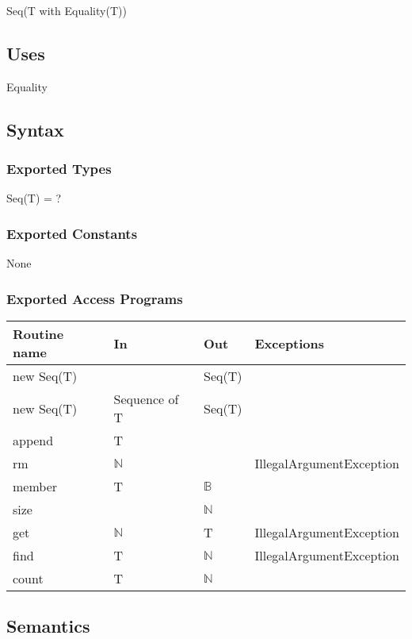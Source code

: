 \documentclass[12pt]{article}
\begin{document}
Seq(T with Equality(T))

\subsection* {Uses}

Equality

\subsection* {Syntax}

\subsubsection* {Exported Types}

Seq(T) = ?

\subsubsection* {Exported Constants}

None

\subsubsection* {Exported Access Programs}

\begin{tabular}{| l | l | l | p{5cm} |}
	\hline
	\textbf{Routine name} & \textbf{In} & \textbf{Out} & \textbf{Exceptions}\\
	\hline
	new Seq(T) & ~ & Seq(T) & ~\\
	\hline
	new Seq(T) & Sequence of T & Seq(T) & ~\\
	\hline
	append & T & ~ & ~\\
	\hline
	rm & $\mathbb{N}$ & ~ & IllegalArgumentException\\
	\hline
	member & T & $\mathbb{B}$ & ~\\
	\hline
	size & ~ & $\mathbb{N}$ & ~\\
	\hline
	get & $\mathbb{N}$ & T & IllegalArgumentException\\
	\hline
	find & T & $\mathbb{N}$ & IllegalArgumentException\\
	\hline
	count & T & $\mathbb{N}$ & ~\\
	\hline
\end{tabular}

\subsection* {Semantics}
\end{document}
